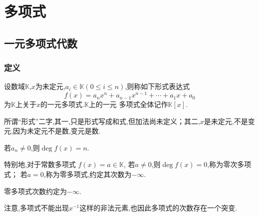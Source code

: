 \newpage
\chapter{多项式}
\setcounter{section}{0}
\section{一元多项式代数}
\subsection{定义}
\begin{formal}
\begin{definition}[一元多项式的定义]\label{def:一元多项式的定义}
    设数域$\mathbb{K}$,$x$为未定元,$a_i\in\mathbb{K}\left(0\leqslant i\leqslant n
    \right)$,则称如下形式表达式
    \[f\left(x\right)=
    a_nx^n+a_{n-1}x^{n-1}+\cdots+a_1x+a_0
    \]
    为$\mathbb{K}$上关于$x$的一元多项式.$\mathbb{K}$上的一元
    多项式全体记作$\mathbb{K}\left[x\right]$.
\end{definition}
\end{formal}
\begin{red}
\begin{remark}
    所谓“形式”二字,其一,只是形式写成和式,但加法尚未定义；其二,$x$是未定元,不是变元,因为未定元不是数,变元是数.
\end{remark}
\end{red}
\begin{formal}
\begin{definition}[次数的约定]\label{def:次数的约定}
    若$a_n\neq 0$,则$\deg f\left(x\right)=n.$

    特别地,对于常数多项式
    $f\left(x\right)=a\in\mathbb{K}$,
    若$a\neq 0$,则$\deg f\left(x\right)=0$,称为零次多项式；
    若$a=0$,称为零多项式,约定其次数为$-\infty.$
\end{definition}
\end{formal}
\begin{red}
\begin{remark}
    零多项式次数约定为$-\infty$.
\end{remark}
\end{red}
\begin{red}
    \begin{remark}
        注意,多项式不能出现$x^{-1}$这样的非法元素,也因此多项式的次数存在一个突变.
    \end{remark}
\end{red}
